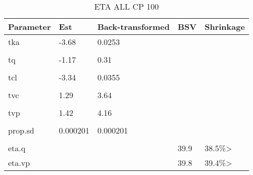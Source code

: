 \begin{table}
\centering\centering
\caption{ETA ALL CP 100}
\centering
\fontsize{8}{10}\selectfont
\begin{tabular}[t]{lllll}
\toprule
\textbf{Parameter} & \textbf{Est} & \textbf{Back-transformed} & \textbf{BSV} & \textbf{Shrinkage}\\
\midrule
tka & -3.68 & 0.0253 &  & \\
\midrule\\
tq & -1.17 & 0.31 &  & \\
\midrule\\
tcl & -3.34 & 0.0355 &  & \\
\midrule\\
tvc & 1.29 & 3.64 &  & \\
\midrule\\
tvp & 1.42 & 4.16 &  & \\
\midrule\\
prop.sd & 0.000201 & 0.000201 &  & \\
\midrule\\
eta.q &  &  & 39.9 & 38.5\%>\\
\midrule
eta.vp &  &  & 39.8 & 39.4\%>\\
\bottomrule
\end{tabular}
\end{table}